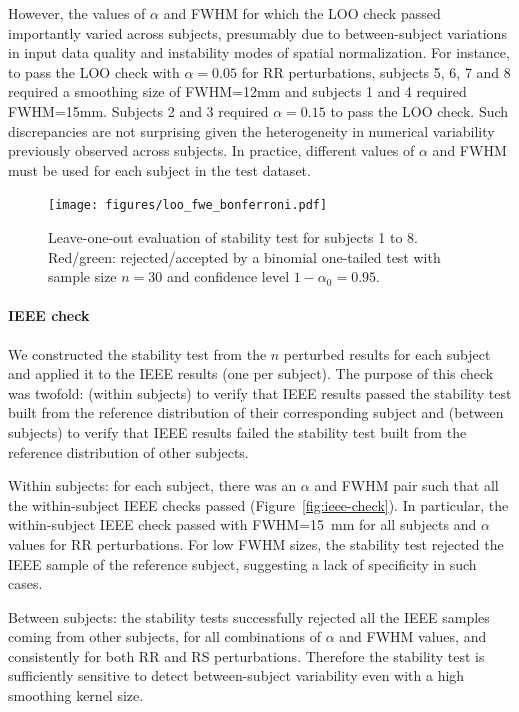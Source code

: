 \documentclass[lettersize,journal]{IEEEtran}
\begin{document}
However, the values of $\alpha$ and FWHM for which the LOO check passed importantly varied across subjects, presumably due to between-subject variations in input data quality and instability modes of spatial normalization. For instance, to pass the LOO check with $\alpha=0.05$ for RR perturbations, subjects 5, 6, 7 and 8 required a smoothing size of FWHM=12mm and subjects 1 and 4 required FWHM=15mm. Subjects 2 and 3 required $\alpha=0.15$ to pass the LOO check. Such discrepancies are not surprising given the heterogeneity in numerical variability previously observed across subjects. In practice, different values of $\alpha$ and FWHM must be used for each subject in the test dataset.

\begin{figure}
    \centering
    \texttt{[image: figures/loo\_fwe\_bonferroni.pdf]}
    \caption{Leave-one-out evaluation of stability test for subjects 1 to 8.
        Red/green: rejected/accepted by a binomial one-tailed test with sample size $n=30$ and confidence level $1-\alpha_0=0.95$.}
    \label{fig:loo_bonferroni}
\end{figure}


\paragraph{IEEE check} We constructed the stability test from the $n$ perturbed results for each subject and applied it to the IEEE results (one per subject). The purpose of this check was twofold: (within subjects) to verify that IEEE results passed the stability test built from the reference distribution of their corresponding subject and (between subjects) to verify that IEEE results failed the stability test built from the reference distribution of other subjects.

Within subjects: for each subject, there was an $\alpha$ and FWHM pair such that all the within-subject IEEE checks passed (Figure~\ref{fig:ieee-check}). In particular, the within-subject IEEE check passed with FWHM=15~mm for all subjects and $\alpha$ values for RR perturbations. For low FWHM sizes, the stability test rejected the IEEE sample of the reference subject, suggesting a lack of specificity in such cases.

Between subjects: the stability tests successfully rejected all the IEEE samples coming from other subjects, for all combinations of $\alpha$ and FWHM values, and consistently for both RR and RS perturbations. Therefore the stability test is sufficiently sensitive to detect between-subject variability even with a high smoothing kernel size.
\end{document}
